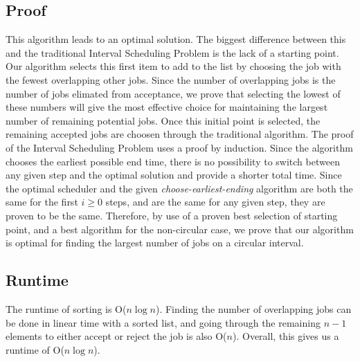 \documentclass[titlepage]{article}
\numberwithin{equation}{subsection}
\begin{document}
\subsection{Proof}
This algorithm leads to an optimal solution. The biggest difference between this and the traditional
Interval Scheduling Problem is the lack of a starting point. Our algorithm selects this first item to
add to the list by choosing the job with the fewest overlapping other jobs. Since the number of overlapping
jobs is the number of jobs elimated from acceptance, we prove that selecting the lowest of these numbers will
give the most effective choice for maintaining the largest number of remaining potential jobs. Once this initial
point is selected, the remaining accepted jobs are choosen through the traditional algorithm. The proof of
the Interval Scheduling Problem uses a proof by induction. Since the algorithm chooses the earliest possible
end time, there is no possibility to switch between any given step and the optimal solution and provide a shorter
total time. Since the optimal scheduler and the given \textit{choose-earliest-ending} algorithm are both the same
for the first $i\geq0$ steps, and are the same for any given step, they are proven to be the same. Therefore, by
use of a proven best selection of starting point, and a best algorithm for the non-circular case, we prove that
our algorithm is optimal for finding the largest number of jobs on a circular interval.
\subsection{Runtime} %
The runtime of sorting is O($n\log n$). Finding the number of overlapping jobs can be done in linear
time with a sorted list, and going through the remaining $n-1$ elements to either accept or reject the job
is also O($n$). Overall, this gives us a runtime of O($n\log n$).
\end{document}
